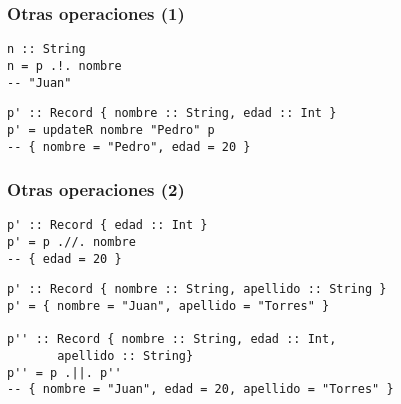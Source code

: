 \documentclass{beamer}
\begin{document}
\begin{frame}[fragile]
\frametitle{Otras operaciones (1)}

\begin{example}[Lookup]
\begin{verbatim}
n :: String
n = p .!. nombre
-- "Juan"
\end{verbatim}
\end{example}

\pause

\vspace{12pt}

\begin{example}[Update]
\begin{verbatim}
p' :: Record { nombre :: String, edad :: Int }
p' = updateR nombre "Pedro" p
-- { nombre = "Pedro", edad = 20 }
\end{verbatim}
\end{example}

\end{frame}

\begin{frame}[fragile]
\frametitle{Otras operaciones (2)}

\begin{example}[Delete]
\begin{verbatim}
p' :: Record { edad :: Int }
p' = p .//. nombre
-- { edad = 20 }
\end{verbatim}
\end{example}

\pause

\begin{example}[Union]
\begin{verbatim}
p' :: Record { nombre :: String, apellido :: String }
p' = { nombre = "Juan", apellido = "Torres" }

p'' :: Record { nombre :: String, edad :: Int,
       apellido :: String}
p'' = p .||. p''
-- { nombre = "Juan", edad = 20, apellido = "Torres" }
\end{verbatim}
\end{example}

\end{frame}
\end{document}
